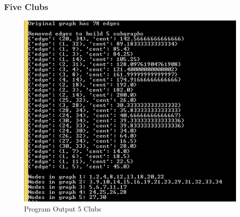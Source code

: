 \documentclass[paper=a4, fontsize=11pt]{scrartcl} %
\numberwithin{equation}{section} %
\numberwithin{figure}{section} %
\numberwithin{table}{section} %
\begin{document}
\subsubsection{Five Clubs}
\begin{figure}[H]
\includegraphics[width=1\textwidth]{5clubs/output}
\caption{Program Output 5 Clubs}
\label{fig:output5}
\end{figure}
\end{document}
